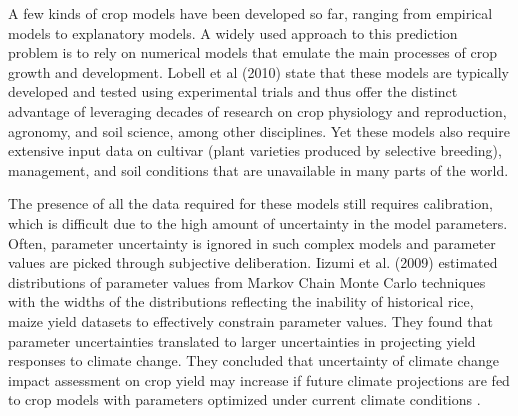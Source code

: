 \documentclass[conference]{IEEEtran}
\begin{document}
A few kinds of crop models have been developed so far, ranging from empirical models to explanatory models. A widely used approach to this prediction problem is to rely on numerical models that emulate the main processes of crop growth and development. Lobell et al (2010)\cite{Lobell2010} state that these models are typically developed and tested using experimental trials and thus offer the distinct advantage of leveraging decades of research on crop physiology and reproduction, agronomy, and soil science, among other disciplines. Yet these models also require extensive input data on cultivar (plant varieties produced by selective breeding), management, and soil conditions that are unavailable in many parts of the world. 

The presence of all the data required for these models still requires calibration, which is difficult due to the high amount of uncertainty in the model parameters. Often, parameter uncertainty is ignored in such complex models and parameter values are picked through subjective deliberation. Iizumi et al. (2009) estimated distributions of parameter values from Markov Chain Monte Carlo techniques with the widths of the distributions reflecting the inability of historical rice, maize yield datasets to effectively constrain parameter values. They found that parameter uncertainties translated to larger uncertainties in projecting yield responses to climate change. They concluded that uncertainty of climate change impact assessment on crop yield may increase if future climate projections are fed to crop models with parameters optimized under current climate conditions \cite{Iizumi2009}.
\end{document}

